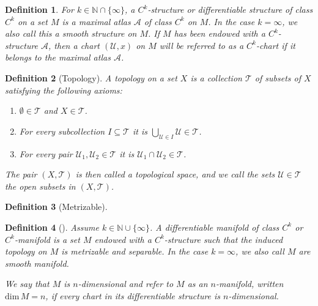 \documentclass{book}
\theoremstyle{custom_definition}
\newtheorem{definition}{Definition}
\theoremstyle{custom_theorem}
\begin{document}
    \begin{definition}
        For \(k \in \mathbb{N} \cap \{\infty\}\), a \(C^k\)-structure or differentiable structure of class \(C^k\) on a set \(M\) is a maximal atlas \(\mathcal{A}\) of class \(C^k\) on \(M\). In the case \(k = \infty\), we also call this a smooth structure on \(M\). If \(M\) has been endowed with a \(C^k\)-structure \(\mathcal{A}\), then a chart \((\mathcal{U}, x)\) on \(M\) will be referred to as a \(C^k\)-chart if it belongs to the maximal atlas \(\mathcal{A}\).
    \end{definition}
    \begin{definition}[Topology]
        A topology on a set \(X\) is a collection \(\mathcal{T}\) of subsets of \(X\) satisfying the following axioms:
        \begin{enumerate}
            \item \(\emptyset \in \mathcal{T}\) and \(X \in \mathcal{T}\).
            \item For every subcollection \(I \subseteq \mathcal{T}\) it is \(\bigcup_{\mathcal{U} \in I} \mathcal{U} \in \mathcal{T}\).
            \item For every pair \(\mathcal{U}_1, \mathcal{U}_2 \in \mathcal{T}\) it is \(\mathcal{U}_1 \cap \mathcal{U}_2 \in \mathcal{T}\).
        \end{enumerate}
        The pair \((X, \mathcal{T})\) is then called a topological space, and we call the sets \(\mathcal{U} \in \mathcal{T}\) the open subsets in \((X, \mathcal{T})\).
    \end{definition}
    \begin{definition}[Metrizable]
        
    \end{definition}
    \begin{definition}[]
        Assume \(k \in \mathbb{N} \cup \{\infty\}\). A differentiable manifold of class \(C^k\) or \(C^k\)-manifold is a set \(M\) endowed with a \(C^k\)-structure such that the induced topology on \(M\) is metrizable and separable. In the case \(k = \infty\), we also call \(M\) are smooth manifold.

        We say that \(M\) is \(n\)-dimensional and refer to \(M\) as an \(n\)-manifold, written \(\text{dim}\, M = n\), if every chart in its differentiable structure is \(n\)-dimensional.
    \end{definition}
\end{document}
